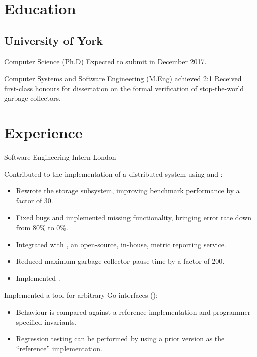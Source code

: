 \documentclass[a4paper]{barrucadu-cv}
\begin{document}
\section{Education}

\subsection{University of York}

  {Computer Science (Ph.D)}
  {}
  {Expected to submit in December 2017.}

  {Computer Systems and Software Engineering (M.Eng)}
  {achieved 2:1}
  {Received first-class honours for dissertation on the formal
    verification of stop-the-world garbage collectors.}

\section{Experience}

  {Software Engineering Intern}
  {London}
  {\begin{tightitemize}
    \item Contributed to the implementation of a distributed system
      using  and :
      \begin{itemize}
      \item Rewrote the storage subsystem, improving benchmark
        performance by a factor of 30.
      \item Fixed bugs and implemented missing functionality, bringing
        error rate down from 80\% to 0\%.
      \item Integrated with , an open-source,
        in-house, metric reporting service.
      \item Reduced maximum garbage collector pause time by a factor
        of 200.
        \item Implemented .
      \end{itemize}
    \item Implemented a tool for  arbitrary Go
      interfaces (\textbf{}):
      \begin{itemize}
      \item Behaviour is compared against a reference implementation
        and programmer-specified invariants.
      \item Regression testing can be performed by using a prior
        version as the ``reference'' implementation.
      \end{itemize}
    \end{tightitemize}}
\end{document}
